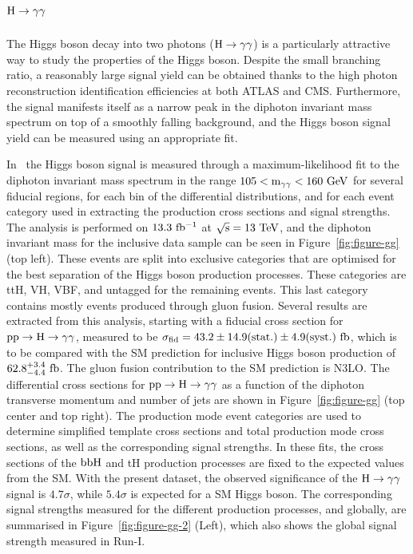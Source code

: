 \documentclass[10pt]{article}
\begin{document}
\section{\boldmath ${\rm H}\to\gamma\gamma$}

The Higgs boson decay into two photons (${\rm H\to\gamma\gamma}$) is a
particularly attractive way to study the properties of the Higgs boson. Despite
the small branching ratio, a reasonably large signal yield can be obtained thanks
to the high photon reconstruction identification efficiencies at both ATLAS and
CMS. Furthermore, the signal manifests itself as a narrow peak in the diphoton
invariant mass spectrum on top of a smoothly falling background, and the Higgs
boson signal yield can be measured using an appropriate fit.

In~\cite{ATLAS-gg} the Higgs boson signal is measured through a
maximum-likelihood fit to the diphoton invariant mass spectrum in the range
${\rm 105 < m_{\gamma\gamma} < 160~GeV}$ for several fiducial regions, for
each bin of the differential distributions, and for each event category used
in extracting the production cross sections and signal strengths. The analysis
is performed on ${\rm 13.3~fb^{-1}}$ at ${\rm \sqrt{s} = 13~TeV}$, and the
diphoton invariant mass for the inclusive data sample can be seen in
Figure~\ref{fig:figure-gg} (top left). These events are split into exclusive
categories that are optimised for the best separation of the Higgs boson
production processes. These categories are ttH, VH, VBF, and untagged for the
remaining events. This last category contains mostly events produced through
gluon fusion. Several results are extracted from this analysis, starting with
a fiducial cross section for ${\rm pp\to H\to \gamma\gamma}$, measured to be
${\rm \sigma_{fid} = 43.2 \pm 14.9(stat.) \pm 4.9(syst.)~fb}$, which is to be
compared with the SM prediction for inclusive Higgs boson production of
${\rm 62.8_{-4.4}^{+3.4}~fb}$. The gluon fusion contribution to the SM
prediction is N3LO. The differential cross sections for ${\rm pp\to H\to \gamma\gamma}$
as a function of the diphoton transverse momentum and number of jets are shown
in Figure~\ref{fig:figure-gg} (top center and top right). The production mode
event categories are used to determine simplified template cross sections and
total production mode cross sections, as well as the corresponding signal
strengths. In these fits, the cross sections of the ${\rm bbH}$ and tH
production processes are fixed to the expected values from the SM. With the
present dataset, the observed significance of the ${\rm H\to\gamma\gamma}$ signal
is $4.7\sigma$, while $5.4\sigma$ is expected for a SM Higgs boson. The corresponding
signal strengths measured for the different production processes, and globally,
are summarised in Figure~\ref{fig:figure-gg-2} (Left), which also shows the global
signal strength measured in Run-I.
\end{document}
